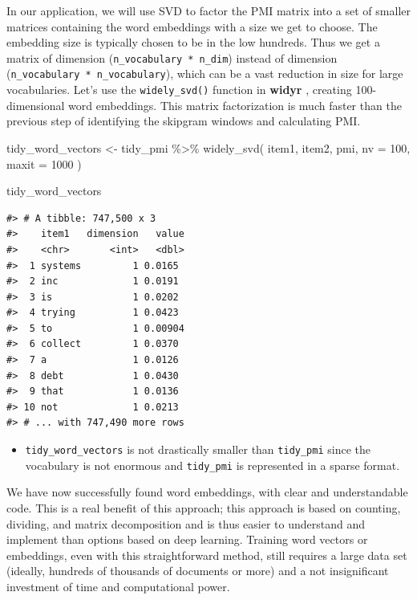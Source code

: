 \documentclass[
]{krantz}
\makeatletter
\newenvironment{Shaded}{\begin{snugshade}}{\end{snugshade}}
\newcommand{\AttributeTok}[1]{\textcolor[rgb]{0.77,0.63,0.00}{#1}}
\newcommand{\DecValTok}[1]{\textcolor[rgb]{0.00,0.00,0.81}{#1}}
\newcommand{\FunctionTok}[1]{\textcolor[rgb]{0.00,0.00,0.00}{#1}}
\newcommand{\NormalTok}[1]{#1}
\newcommand{\OtherTok}[1]{\textcolor[rgb]{0.56,0.35,0.01}{#1}}
\newcommand{\SpecialCharTok}[1]{\textcolor[rgb]{0.00,0.00,0.00}{#1}}
\newenvironment{kframe}{%
\medskip{}
\setlength{\fboxsep}{.8em}
 \def\at@end@of@kframe{}%
 \ifinner\ifhmode%
  \def\at@end@of@kframe{\end{minipage}}%
  \begin{minipage}{\columnwidth}%
 \fi\fi%
 \def\FrameCommand##1{\hskip\@totalleftmargin \hskip-\fboxsep
 \colorbox{shadecolor}{##1}\hskip-\fboxsep
     \hskip-\linewidth \hskip-\@totalleftmargin \hskip\columnwidth}%
 \MakeFramed {\advance\hsize-\width
   \@totalleftmargin\z@ \linewidth\hsize
   \@setminipage}}%
 {\par\unskip\endMakeFramed%
 \at@end@of@kframe}
\renewenvironment{Shaded}{\begin{kframe}}{\end{kframe}}
\newenvironment{rmdblock}[1]
  {\begin{shaded*}
  \begin{itemize}[left = -1cm, labelsep = 1cm]
  \renewcommand{\labelitemi}{
    \raisebox{-.7\height}[0pt][0pt]{
      {\setkeys{Gin}{width=3em,keepaspectratio}\texttt{[image: images/\#1]}}
    }
  }
 
  \item
  }
  {
  \end{itemize}
  \end{shaded*}
  }
\newenvironment{rmdnote}
  {\begin{rmdblock}{note}}
  {\end{rmdblock}}
\makeatother
\begin{document}
In our application, we will use SVD to factor the PMI matrix into a set of smaller matrices containing the word embeddings with a size we get to choose. The embedding size is typically chosen to be in the low hundreds. Thus we get a matrix of dimension (\texttt{n\_vocabulary\ *\ n\_dim}) instead of dimension (\texttt{n\_vocabulary\ *\ n\_vocabulary}), which can be a vast reduction in size for large vocabularies.
Let's use the \texttt{widely\_svd()} function in \textbf{widyr} \citep{R-widyr}, creating 100-dimensional word embeddings. This matrix factorization is much faster than the previous step of identifying the skipgram windows and calculating PMI.

\begin{Shaded}
\begin{Highlighting}[]
\NormalTok{tidy\_word\_vectors }\OtherTok{\textless{}{-}}\NormalTok{ tidy\_pmi }\SpecialCharTok{\%\textgreater{}\%}
  \FunctionTok{widely\_svd}\NormalTok{(}
\NormalTok{    item1, item2, pmi,}
    \AttributeTok{nv =} \DecValTok{100}\NormalTok{, }\AttributeTok{maxit =} \DecValTok{1000}
\NormalTok{  )}

\NormalTok{tidy\_word\_vectors}
\end{Highlighting}
\end{Shaded}

\begin{verbatim}
#> # A tibble: 747,500 x 3
#>    item1   dimension   value
#>    <chr>       <int>   <dbl>
#>  1 systems         1 0.0165 
#>  2 inc             1 0.0191 
#>  3 is              1 0.0202 
#>  4 trying          1 0.0423 
#>  5 to              1 0.00904
#>  6 collect         1 0.0370 
#>  7 a               1 0.0126 
#>  8 debt            1 0.0430 
#>  9 that            1 0.0136 
#> 10 not             1 0.0213 
#> # ... with 747,490 more rows
\end{verbatim}

\begin{rmdnote}
\texttt{tidy\_word\_vectors} is not drastically smaller than
\texttt{tidy\_pmi} since the vocabulary is not enormous and
\texttt{tidy\_pmi} is represented in a sparse format.
\end{rmdnote}

We have now successfully found word embeddings, with clear and understandable code. This is a real benefit of this approach; this approach is based on counting, dividing, and matrix decomposition and is thus easier to understand and implement than options based on deep learning. Training word vectors or embeddings, even with this straightforward method, still requires a large data set (ideally, hundreds of thousands of documents or more) and a not insignificant investment of time and computational power.
\end{document}
